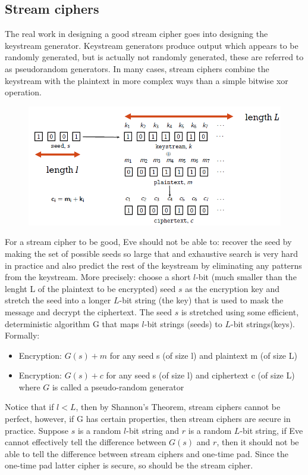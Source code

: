 \subsection{Stream ciphers}
The real work in designing a good stream cipher goes into designing the keystream generator. Keystream generators produce output which appears to be randomly generated, but is actually not randomly generated, these are referred to as pseudorandom generators. In many cases, stream ciphers combine the keystream with the plaintext in more complex ways than a simple bitwise xor operation.

\begin{figure}
	\centering
	\includegraphics[width=0.7\linewidth]{Images/Chapter2/screenshot000}
	\caption{}
	\label{fig:chapter2_screenshot000}
\end{figure}


For a stream cipher to be good, Eve should not be able to: recover the seed by making the set of possible seeds so large that and exhaustive search is very hard in practice and also predict the rest of the keystream by eliminating any patterns from the keystream.
More precisely: choose a short $l$-bit (much smaller than the lenght L of the plaintext to be encrypted) seed $s$ as the encryption key and stretch the seed into a longer $L$-bit string (the key) that is used  to mask the message and decrypt the ciphertext. The seed $s$ is stretched using some efficient, deterministic algorithm G that maps $l$-bit strings (seeds) to $L$-bit strings(keys). Formally:
\begin{itemize}
	\item Encryption: $G(s)+m$ for any seed s (of size l) and plaintext m (of size L)
	\item Encryption: $G(s) + c$ for any seed s (of size l) and ciphertext c (of size L) where $G$ is called a pseudo-random generator
\end{itemize}

Notice that if $l<L$, then by Shannon’s Theorem, stream ciphers cannot be perfect, however, if G has certain properties, then stream ciphers are secure in practice. Suppose $s$ is a random $l$-bit string and $r$ is a random $L$-bit string, if Eve cannot effectively tell the difference between $G(s)$ and $r$, then it should not be able to tell the difference between stream ciphers and one-time pad. Since the one-time pad latter cipher is secure, so should be the stream cipher.

